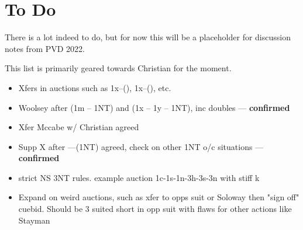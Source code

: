 \documentclass[main]{subfile}
\begin{document}
	
	\chapter{To Do}
	
	There is a lot indeed to do, but for now this will be a placeholder for discussion notes from PVD 2022.
	
	This list is primarily geared towards Christian for the moment.
	
	\begin{itemize}
		\item Xfers in auctions such as 1x--(), 1x--(), etc.
		\item Woolsey after (1m -- 1NT) and (1x -- 1y -- 1NT), inc doubles  --- \textbf{confirmed}
		\item Xfer Mccabe w/ Christian agreed
		\item Supp X after ----(1NT) agreed, check on other 1NT o/c situations --- \textbf{confirmed}
		\item strict NS 3NT rules.  example auction 1c-1s-1n-3h-3s-3n with stiff k
		\item Expand on weird auctions, such as xfer to opps suit or Soloway  then "sign off" cuebid. Should be 3 suited short in opp suit with flaws for other actions like Stayman
	\end{itemize}
\end{document}
